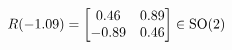\documentclass[preview]{standalone}
\begin{document}
\begin{align*}
\special{dvisvgm:raw <g id='unique000'>}R(-1.09) = \begin{bmatrix} 0.46 & 0.89 \\ -0.89 & 0.46 \end{bmatrix} \in \text{SO}(2)\special{dvisvgm:raw </g>}
\end{align*}
\end{document}
